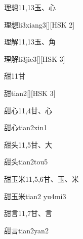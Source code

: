 \begin{entry}{理想}{11,13}{⽟、⼼}
  \begin{phonetics}{理想}{li3xiang3}[][HSK 2]
  \end{phonetics}
\end{entry}

\begin{entry}{理解}{11,13}{⽟、⾓}
  \begin{phonetics}{理解}{li3jie3}[][HSK 3]
  \end{phonetics}
\end{entry}

\begin{entry}{甜}{11}{⽢}
  \begin{phonetics}{甜}{tian2}[][HSK 3]
  \end{phonetics}
\end{entry}

\begin{entry}{甜心}{11,4}{⽢、⼼}
  \begin{phonetics}{甜心}{tian2xin1}
  \end{phonetics}
\end{entry}

\begin{entry}{甜头}{11,5}{⽢、⼤}
  \begin{phonetics}{甜头}{tian2tou5}
  \end{phonetics}
\end{entry}

\begin{entry}{甜玉米}{11,5,6}{⽢、⽟、⽶}
  \begin{phonetics}{甜玉米}{tian2 yu4mi3}
  \end{phonetics}
\end{entry}

\begin{entry}{甜言}{11,7}{⽢、⾔}
  \begin{phonetics}{甜言}{tian2yan2}
  \end{phonetics}
\end{entry}


